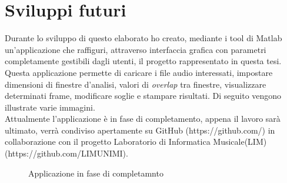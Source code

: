 \documentclass[12pt]{report}
\begin{document}
\clearpage

	\section{Sviluppi futuri}
	\label{cap5sec2}
	Durante lo sviluppo di questo elaborato ho creato, mediante i tool di Matlab un'applicazione che raffiguri, attraverso interfaccia grafica con parametri completamente gestibili dagli utenti, il progetto rappresentato in questa tesi. Questa applicazione permette di caricare i file audio interessati, impostare dimensioni di finestre d'analisi, valori di {\itshape overlap} tra finestre, visualizzare determinati frame, modificare soglie e stampare risultati. Di seguito vengono illustrate varie immagini.\\
Attualmente l'applicazione è in fase di completamento, appena il lavoro sarà ultimato, verrà condiviso apertamente su GitHub (https://github.com/) in collaborazione con il progetto Laboratorio di Informatica Musicale(LIM) (https://github.com/LIMUNIMI).

\begin{figure}[htbp] 
\centering 
{} 
\hspace{7mm} 
\caption{Applicazione in fase di completamnto} 
\label{app}
\end{figure}
\end{document}
